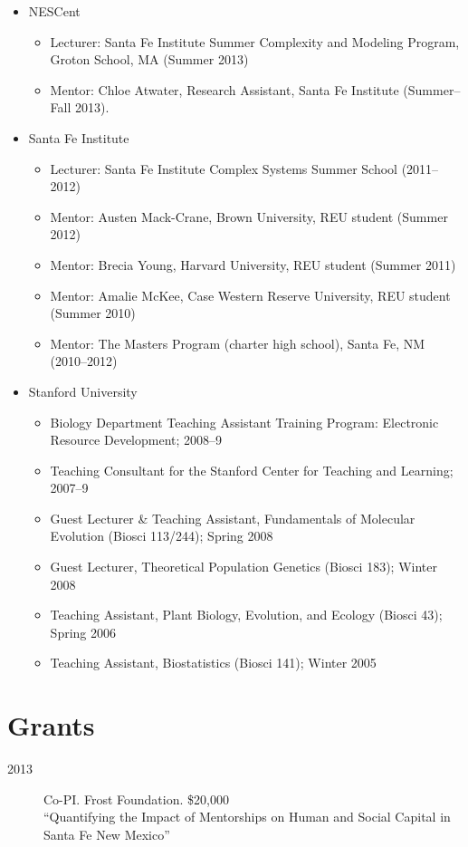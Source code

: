 \documentclass[11pt]{article}
\begin{document}
  \begin{itemize}
  \item NESCent
    \begin{itemize}
    \item Lecturer: Santa Fe Institute Summer Complexity and Modeling Program, \\
      Groton School, MA (Summer 2013)
    \item Mentor: Chloe Atwater, Research Assistant, Santa Fe Institute (Summer--Fall 2013).
    \end{itemize}
  \item Santa Fe Institute
    \begin{itemize}
    \item Lecturer: Santa Fe Institute Complex Systems Summer School (2011--2012)
    \item Mentor: Austen Mack-Crane, Brown University, REU student (Summer 2012)
    \item Mentor: Brecia Young, Harvard University, REU student (Summer 2011)
    \item Mentor: Amalie McKee, Case Western Reserve University, REU student (Summer 2010)
    \item Mentor: The Masters Program  (charter high school), Santa Fe, NM (2010--2012)
    \end{itemize}
  \item Stanford University
    \begin{itemize}
    \item Biology Department Teaching Assistant Training Program: Electronic Resource Development; 2008--9
    \item Teaching Consultant for the Stanford Center for Teaching and Learning; 2007--9
    \item Guest Lecturer \& Teaching Assistant, Fundamentals of Molecular Evolution (Biosci 113/244); Spring 2008
    \item Guest Lecturer, Theoretical Population Genetics (Biosci 183); Winter 2008
    \item Teaching Assistant, Plant Biology, Evolution, and Ecology (Biosci 43); Spring 2006
    \item Teaching Assistant, Biostatistics (Biosci 141); Winter 2005
    \end{itemize}
  \end{itemize}

  \section{Grants}
  \begin{description}
  \item[2013] Co-PI. Frost Foundation. \$20,000 \\
    ``Quantifying the Impact of Mentorships on Human and Social Capital in Santa Fe New Mexico''
  \end{description}
  
\end{document}
